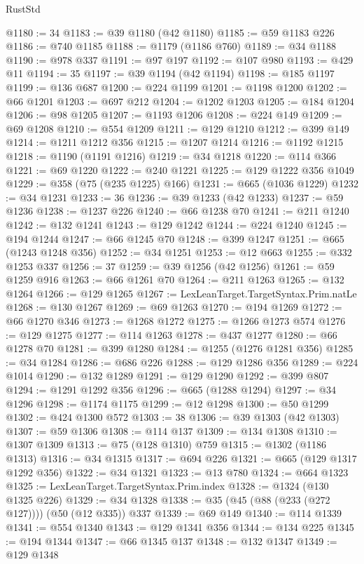 \begin{lexlean}{RustStd}
\begin{coremodule}
{\begin{coremodule}
{{{{{{{{{{{{{{{{{{{{{{{{{{{{{{{{{{{{{{{{{{{@1180 := 34
@1183 := @39 @1180 (@42 @1180)
@1185 := @59 @1183 @226
@1186 := @740 @1185
@1188 := @1179 (@1186 @760)
@1189 := @34 @1188
@1190 := @978 @337
@1191 := @97 @197
@1192 := @107 @980
@1193 := @429 @11
@1194 := 35
@1197 := @39 @1194 (@42 @1194)
@1198 := @185 @1197
@1199 := @136 @687
@1200 := @224 @1199
@1201 := @1198 @1200
@1202 := @66 @1201
@1203 := @697 @212
@1204 := @1202 @1203
@1205 := @184 @1204
@1206 := @98 @1205
@1207 := @1193 @1206
@1208 := @224 @149
@1209 := @69 @1208
@1210 := @554 @1209
@1211 := @129 @1210
@1212 := @399 @149
@1214 := @1211 @1212 @356
@1215 := @1207 @1214
@1216 := @1192 @1215
@1218 := @1190 (@1191 @1216)
@1219 := @34 @1218
@1220 := @114 @366
@1221 := @69 @1220
@1222 := @240 @1221
@1225 := @129 @1222 @356 @1049
@1229 := @358 (@75 (@235 @1225) @166)
@1231 := @665 (@1036 @1229)
@1232 := @34 @1231
@1233 := 36
@1236 := @39 @1233 (@42 @1233)
@1237 := @59 @1236
@1238 := @1237 @226
@1240 := @66 @1238 @70
@1241 := @211 @1240
@1242 := @132 @1241
@1243 := @129 @1242
@1244 := @224 @1240
@1245 := @194 @1244
@1247 := @66 @1245 @70
@1248 := @399 @1247
@1251 := @665 (@1243 @1248 @356)
@1252 := @34 @1251
@1253 := @12 @663
@1255 := @332 @1253 @337
@1256 := 37
@1259 := @39 @1256 (@42 @1256)
@1261 := @59 @1259 @916
@1263 := @66 @1261 @70
@1264 := @211 @1263
@1265 := @132 @1264
@1266 := @129 @1265
@1267 := LexLeanTarget.TargetSyntax.Prim.natLe
@1268 := @130 @1267
@1269 := @69 @1263
@1270 := @194 @1269
@1272 := @66 @1270 @346
@1273 := @1268 @1272
@1275 := @1266 @1273 @574
@1276 := @129 @1275
@1277 := @114 @1263
@1278 := @437 @1277
@1280 := @66 @1278 @70
@1281 := @399 @1280
@1284 := @1255 (@1276 @1281 @356)
@1285 := @34 @1284
@1286 := @686 @226
@1288 := @129 @1286 @356
@1289 := @224 @1014
@1290 := @132 @1289
@1291 := @129 @1290
@1292 := @399 @807
@1294 := @1291 @1292 @356
@1296 := @665 (@1288 @1294)
@1297 := @34 @1296
@1298 := @1174 @1175
@1299 := @12 @1298
@1300 := @50 @1299
@1302 := @424 @1300 @572
@1303 := 38
@1306 := @39 @1303 (@42 @1303)
@1307 := @59 @1306
@1308 := @114 @137
@1309 := @134 @1308
@1310 := @1307 @1309
@1313 := @75 (@128 @1310) @759
@1315 := @1302 (@1186 @1313)
@1316 := @34 @1315
@1317 := @694 @226
@1321 := @665 (@129 @1317 @1292 @356)
@1322 := @34 @1321
@1323 := @13 @780
@1324 := @664 @1323
@1325 := LexLeanTarget.TargetSyntax.Prim.index
@1328 := @1324 (@130 @1325 @226)
@1329 := @34 @1328
@1338 := @35 (@45 (@88 (@233 (@272 @127)))) (@50 (@12 @335)) @337
@1339 := @69 @149
@1340 := @114 @1339
@1341 := @554 @1340
@1343 := @129 @1341 @356
@1344 := @134 @225
@1345 := @194 @1344
@1347 := @66 @1345 @137
@1348 := @132 @1347
@1349 := @129 @1348
}}}}}}}}}}}}}}}}}}}}}}}}}}}}}}}}}}}}}}}}}}}
\end{coremodule}}
\end{coremodule}
\end{lexlean}
